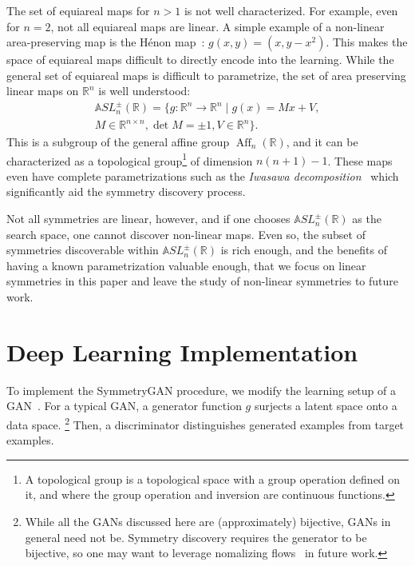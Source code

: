 \documentclass[aps,prx,reprint,preprintnumbers,superscriptaddress,nofootinbib,longbibliography,floatfix]{revtex4-1}
\newcommand{\A}{\mathbb{A}}
\newcommand{\R}{\mathbb{R}}
\begin{document}
The set of equiareal maps for $n > 1$ is not well characterized.
%
For example, even for $n = 2$, not all equiareal maps are linear.
%
A simple example of a non-linear area-preserving map is the H\'{e}non map~\cite{10.2307/43635985}: $g(x,y)=(x,y-x^2)$.
%
This makes the space of equiareal maps difficult to directly encode into the learning.
%
While the general set of equiareal maps is difficult to parametrize, the set of area preserving linear maps on $\mathbb R^n$ is well understood:
%
\begin{multline*}
    \A SL^\pm_n(\mathbb{R}) = \{g: \R^n\to\R^n \; | \; g(x) = Mx + V,\\ M\in \R^{n\times n}, \det M = \pm 1, V\in \R^n\}.
\end{multline*}
%
This is a subgroup of the general affine group $\operatorname{Aff}_n(\R)$, and it can be characterized as a topological group\footnote{A topological group is a topological space with a group operation defined on it, and where the group operation and inversion are continuous functions.} of dimension $n(n+1) - 1$.
%
These maps even have complete parametrizations such as the \textit{Iwasawa decomposition}~\cite{10.2307/1969548} which significantly aid the symmetry discovery process.


Not all symmetries are linear, however, and if one chooses $\A SL^\pm_n(\mathbb{R})$ as the search space, one cannot discover non-linear maps.
%
Even so, the subset of symmetries discoverable within $\A SL^\pm_n(\mathbb{R})$ is rich enough, and the benefits of having a known parametrization valuable enough, that we focus on linear symmetries in this paper and leave the study of non-linear symmetries to future work.


\section{Deep Learning Implementation}
\label{sec:ML}


To implement the SymmetryGAN procedure, we modify the learning setup of a GAN~\cite{Goodfellow:2014upx}.
%
For a typical GAN, a generator function $g$ surjects a latent space onto a data space.%
%
\footnote{While all the GANs discussed here are (approximately) bijective, GANs in general need not be. Symmetry discovery requires the generator to be bijective, so one may want to leverage nomalizing flows~\cite{10.5555/3045118.3045281,Kobyzev2020} in future work.}
%
Then, a discriminator distinguishes generated examples from target examples.
\end{document}
